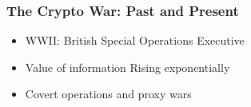 \documentclass[12pt]{beamer}
\begin{document}
\begin{frame}
\frametitle{The Crypto War: Past and Present}
\begin{itemize}
\item<2-> WWII: British Special Operations Executive
\item<3-> Value of information Rising exponentially
\item<4-> Covert operations and proxy wars
\end{itemize}
\begin{columns}
\begin{column}{0.5\textwidth}
\begin{center}
\end{center}
\end{column}
\begin{column}{0.5\textwidth}
\begin{center}

\end{center}
\end{column}
\end{columns}
\end{frame}
\end{document}
